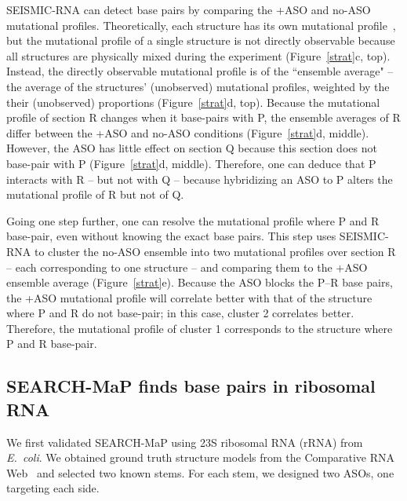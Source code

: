 \documentclass[main.tex]{subfiles}
\begin{document}
SEISMIC-RNA can detect base pairs by comparing the +ASO and no-ASO mutational profiles.
Theoretically, each structure has its own mutational profile~\cite{Sherpa2015}, but the mutational profile of a single structure is not directly observable because all structures are physically mixed during the experiment (Figure~\ref{strat}c, top).
Instead, the directly observable mutational profile is of the ``ensemble average" -- the average of the structures' (unobserved) mutational profiles, weighted by the their (unobserved) proportions (Figure~\ref{strat}d, top).
Because the mutational profile of section R changes when it base-pairs with P, the ensemble averages of R differ between the +ASO and no-ASO conditions (Figure~\ref{strat}d, middle).
However, the ASO has little effect on section Q because this section does not base-pair with P (Figure~\ref{strat}d, middle).
Therefore, one can deduce that P interacts with R -- but not with Q -- because hybridizing an ASO to P alters the mutational profile of R but not of Q.

Going one step further, one can resolve the mutational profile where P and R base-pair, even without knowing the exact base pairs.
This step uses SEISMIC-RNA to cluster the no-ASO ensemble into two mutational profiles over section R -- each corresponding to one structure -- and comparing them to the +ASO ensemble average (Figure~\ref{strat}e).
Because the ASO blocks the P--R base pairs, the +ASO mutational profile will correlate better with that of the structure where P and R do not base-pair; in this case, cluster 2 correlates better.
Therefore, the mutational profile of cluster 1 corresponds to the structure where P and R base-pair.

\subsection{SEARCH-MaP finds base pairs in ribosomal RNA}

We first validated SEARCH-MaP using 23S ribosomal RNA (rRNA) from \textit{E.~coli}.
We obtained ground truth structure models from the Comparative RNA Web~\cite{Cannone2002} and selected two known stems.
For each stem, we designed two ASOs, one targeting each side.
\end{document}
